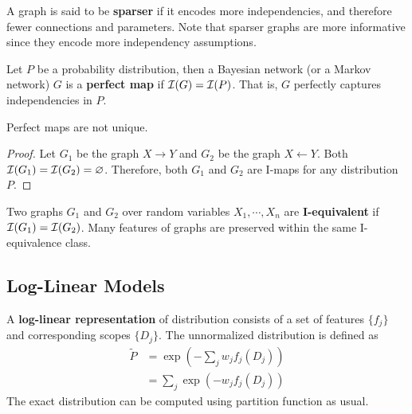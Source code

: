 \documentclass[11pt]{article}
\begin{document}
	\begin{remark}
		A graph is said to be \textbf{sparser} if it encodes more independencies, and therefore fewer connections and parameters.
		Note that sparser graphs are more informative since they encode more independency assumptions.
	\end{remark}

	\begin{definition}
		Let $P$ be a probability distribution, then a Bayesian network (or a Markov network) $G$ is a \textbf{perfect map} if $\mathcal{{I}}(G) = \mathcal{{I}}(P)$. That is, $G$ perfectly captures independencies in $P$.
	\end{definition}

	\begin{proposition}
		Perfect maps are not unique.
	\end{proposition}
	
	\begin{proof}
		Let $G_1$ be the graph $X \rightarrow Y$ and $G_2$ be the graph $X \leftarrow Y$. Both $\mathcal{{I}}(G_1) = \mathcal{{I}}(G_2) = \varnothing$. Therefore, both $G_1$ and $G_2$ are I-maps for any distribution $P$.
	\end{proof}
	
	\begin{definition}
		Two graphs $G_1$ and $G_2$ over random variables $X_1, \cdots, X_n$ are \textbf{I-equivalent} if $\mathcal{{I}}(G_1) = \mathcal{{I}}(G_2)$. Many features of graphs are preserved within the same I-equivalence class.
	\end{definition}
	
	\subsection{Log-Linear Models}
	
	\begin{definition}
		A \textbf{log-linear representation} of distribution consists of a set of features $\{f_j\}$ and corresponding scopes $\{D_j\}$. The unnormalized distribution is defined as
		\begin{align}
			\tilde{P} &= \exp \left(- \sum_{j} w_j f_j(D_j) \right) \\
			&= \sum_j \exp(-w_j f_j(D_j))
		\end{align}
		The exact distribution can be computed using partition function as usual.
	\end{definition}
	
\end{document}
